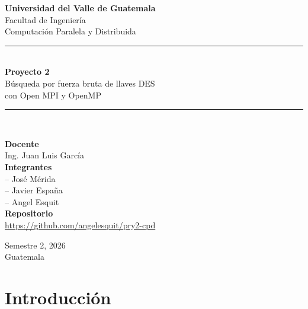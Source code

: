 \documentclass[11pt,letterpaper]{article}
\begin{document}
\begin{titlepage}
    \centering
    \vspace*{1cm}

    {\Large \textbf{Universidad del Valle de Guatemala}}\\[0.3cm]
    {\large Facultad de Ingeniería}\\[0.3cm]
    {\large Computación Paralela y Distribuida}\\[2cm]

    \rule{\linewidth}{0.5mm} \\[0.4cm]
    {\huge \textbf{Proyecto 2}}\\[0.2cm]
    {\LARGE Búsqueda por fuerza bruta de llaves DES\\ con Open MPI y OpenMP}\\[0.4cm]
    \rule{\linewidth}{0.5mm} \\[2cm]

    \begin{flushleft}
        \textbf{Docente}\\
        \quad Ing. Juan Luis García\\[0.3cm]
        \textbf{Integrantes}\\
        \quad -- José Mérida\\
        \quad -- Javier España\\
        \quad -- Angel Esquit\\[0.5cm]
        \textbf{Repositorio}\\
        \quad \url{https://github.com/angelesquit/pry2-cpd}\\
    \end{flushleft}

    \vfill

    {\large Semestre 2, 2026}\\
    {\large Guatemala}

\end{titlepage}

\tableofcontents
\newpage

\section{Introducción}
\end{document}
